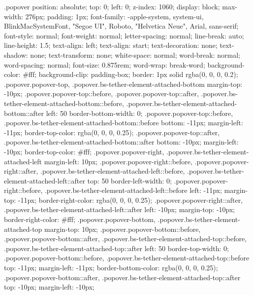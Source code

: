 {{{{{{{{{{{{{{{{{{{{{{{{{{{{{{{{{{{{{{{{{{{{{{{{{{{{{{{{{{{{{{{{{{{{{{{{{{{{{{{{{{{{{{{{{{{{{{{{{{{{{{{{{{{{{{{{{{{{{{{{{{{{{{{{{{{{{{{{{{{{{{{{{{{{{{{{{{{{{{{{{{{{{{{{{{{{{{{{{{{{{{{{{{{{{{{{{{{{{{{{{{{{{{{{{{{{{{{{{{{{{{{{{{{{{{{{{{{{{{{{{{{{{{{{{{{{{{{{{{{{{{{{{{{{{{{{{{{{{{{{{{{{{.popover {
  position: absolute;
  top: 0;
  left: 0;
  z-index: 1060;
  display: block;
  max-width: 276px;
  padding: 1px;
  font-family: -apple-system, system-ui, BlinkMacSystemFont, "Segoe UI", Roboto, "Helvetica Neue", Arial, sans-serif;
  font-style: normal;
  font-weight: normal;
  letter-spacing: normal;
  line-break: auto;
  line-height: 1.5;
  text-align: left;
  text-align: start;
  text-decoration: none;
  text-shadow: none;
  text-transform: none;
  white-space: normal;
  word-break: normal;
  word-spacing: normal;
  font-size: 0.875rem;
  word-wrap: break-word;
  background-color: #fff;
  background-clip: padding-box;
  border: 1px solid rgba(0, 0, 0, 0.2); }
  .popover.popover-top, .popover.bs-tether-element-attached-bottom {
    margin-top: -10px; }
    .popover.popover-top::before, .popover.popover-top::after, .popover.bs-tether-element-attached-bottom::before, .popover.bs-tether-element-attached-bottom::after {
      left: 50%
      border-bottom-width: 0; }
    .popover.popover-top::before, .popover.bs-tether-element-attached-bottom::before {
      bottom: -11px;
      margin-left: -11px;
      border-top-color: rgba(0, 0, 0, 0.25); }
    .popover.popover-top::after, .popover.bs-tether-element-attached-bottom::after {
      bottom: -10px;
      margin-left: -10px;
      border-top-color: #fff; }
  .popover.popover-right, .popover.bs-tether-element-attached-left {
    margin-left: 10px; }
    .popover.popover-right::before, .popover.popover-right::after, .popover.bs-tether-element-attached-left::before, .popover.bs-tether-element-attached-left::after {
      top: 50%
      border-left-width: 0; }
    .popover.popover-right::before, .popover.bs-tether-element-attached-left::before {
      left: -11px;
      margin-top: -11px;
      border-right-color: rgba(0, 0, 0, 0.25); }
    .popover.popover-right::after, .popover.bs-tether-element-attached-left::after {
      left: -10px;
      margin-top: -10px;
      border-right-color: #fff; }
  .popover.popover-bottom, .popover.bs-tether-element-attached-top {
    margin-top: 10px; }
    .popover.popover-bottom::before, .popover.popover-bottom::after, .popover.bs-tether-element-attached-top::before, .popover.bs-tether-element-attached-top::after {
      left: 50%
      border-top-width: 0; }
    .popover.popover-bottom::before, .popover.bs-tether-element-attached-top::before {
      top: -11px;
      margin-left: -11px;
      border-bottom-color: rgba(0, 0, 0, 0.25); }
    .popover.popover-bottom::after, .popover.bs-tether-element-attached-top::after {
      top: -10px;
      margin-left: -10px;
}}}}}}}}}}}}}}}}}}}}}}}}}}}}}}}}}}}}}}}}}}}}}}}}}}}}}}}}}}}}}}}}}}}}}}}}}}}}}}}}}}}}}}}}}}}}}}}}}}}}}}}}}}}}}}}}}}}}}}}}}}}}}}}}}}}}}}}}}}}}}}}}}}}}}}}}}}}}}}}}}}}}}}}}}}}}}}}}}}}}}}}}}}}}}}}}}}}}}}}}}}}}}}}}}}}}}}}}}}}}}}}}}}}}}}}}}}}}}}}}}}}}}}}}}}}}}}}}}}}}}}}}}}}}}}}}}}}}}}}}}}}}}}
